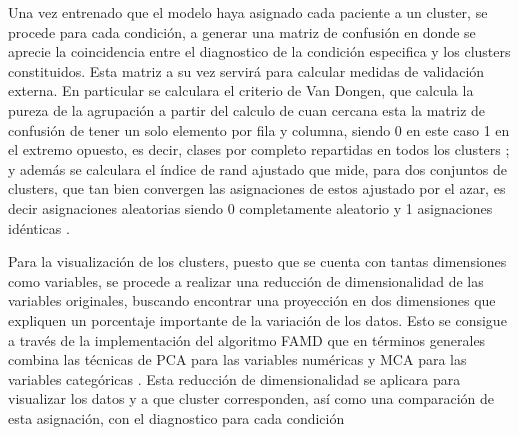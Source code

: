  \medbreak
 
 Una vez entrenado que el modelo haya asignado cada paciente a un cluster, se procede para cada condición, a generar una matriz de confusión en donde se aprecie la coincidencia entre el diagnostico de la condición especifica y los clusters constituidos. Esta matriz a su vez servirá para calcular medidas de validación externa. En particular se calculara el criterio de Van Dongen, que calcula la pureza de la agrupación a partir del calculo de cuan cercana esta la matriz de confusión de tener un solo elemento por fila y columna, siendo 0 en este caso 1 en el extremo opuesto, es decir, clases por completo repartidas en todos los clusters \cite{van2000performance}; y además se calculara el índice de rand ajustado que mide, para dos conjuntos de clusters, que tan bien convergen las asignaciones de estos ajustado por el azar, es decir asignaciones aleatorias siendo 0 completamente aleatorio y 1 asignaciones idénticas \cite{hubert1985comparing}.

 \medbreak
 
 Para la visualización de los clusters, puesto que se cuenta con tantas dimensiones como variables, se procede a realizar una reducción de dimensionalidad de las variables originales, buscando encontrar una proyección en dos dimensiones que expliquen un porcentaje importante de la variación de los datos. Esto se consigue a través de la implementación del algoritmo FAMD que en términos generales combina las técnicas de PCA para las variables numéricas y MCA para las variables categóricas \cite{pages2002analyse}. Esta reducción de dimensionalidad se aplicara para visualizar los datos y a que cluster corresponden, así como una comparación de esta asignación, con el diagnostico para cada condición















